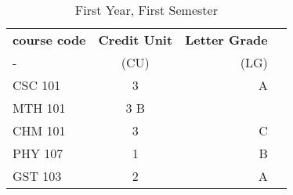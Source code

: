 \documentclass{article}
\begin{document}
	
\begin{table}[h!]
	\begin{center}
		\caption{First Year, First Semester}
		\label{tab:table1}
		\begin{tabular}{l|c|r|c}
			\textbf{course code} & \textbf{Credit Unit} & \textbf{Letter Grade}\\
			- & (CU) & (LG) \\
			\hline
			CSC 101 & 3 & A\\
			MTH 101 & 3 B\\
			CHM 101 & 3 & C\\
			PHY 107 & 1 & B\\
			GST 103 & 2 & A\\
		

     \end{tabular}
     \end{center}
    \end{table}
\end{document}

